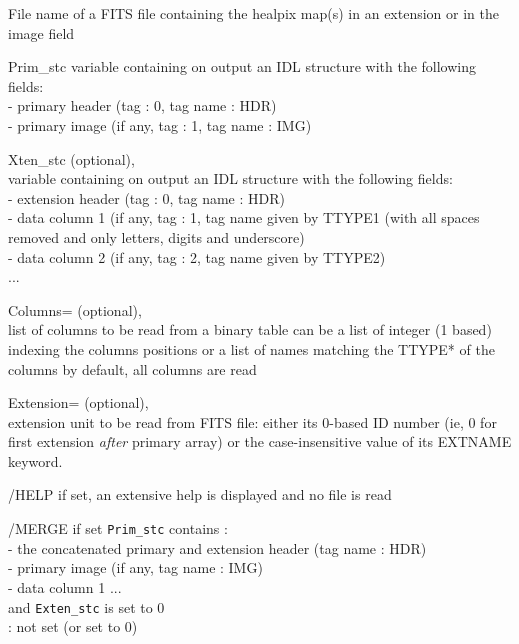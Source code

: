\begin{qualifiers}
  \begin{qulist}{} %
 	\item[{File}] 
          name of a FITS file containing 
               the healpix map(s) in an extension or in the image field 

 	\item[{Prim\_stc}] 
	variable containing on output an IDL structure with the following fields: \\
		- primary header (tag : 0, tag name : HDR) \\
		- primary image (if any, tag : 1, tag name : IMG)

       \item[{Xten\_stc}]
		  (optional), \\
	variable containing on output an IDL structure with the following fields: \\
		- extension header (tag : 0, tag name : HDR) \\
		- data column 1 (if any, tag : 1, tag name given by TTYPE1 (with all
                    spaces removed and only letters, digits and underscore) \\
		- data column 2 (if any, tag : 2, tag name given by TTYPE2)  \\
		...

      \item[{Columns=}]
		(optional), \\
        list of columns to be read from a binary table 
        can be a list of integer (1 based) indexing the columns positions
        or a list of names matching the TTYPE* of the columns
        by default, all columns are read

       \item[{Extension=}]
		(optional), \\
	extension unit to be read from FITS file: 
 either its 0-based ID number (ie, 0 for first extension {\em after} primary array) 
 or the case-insensitive value of its EXTNAME keyword.
  \end{qulist}
\end{qualifiers}

\begin{keywords}
  \begin{kwlist}{} %
	\item[{/HELP}] if set, an extensive help is displayed and no
	file is read
	\item[{/MERGE}]
	if set {\tt Prim\_stc} contains : \\
		- the concatenated primary and extension header (tag name : HDR) \\
		- primary image (if any, tag name : IMG) \\
		- data column 1 ... \\
	and {\tt Exten\_stc} is set to 0 \\
	 : not set (or set to 0)
   \end{kwlist}
\end{keywords}

